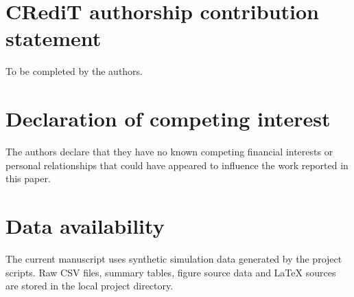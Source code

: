 \documentclass[preprint,12pt,number]{elsarticle}
\begin{document}
\section*{CRediT authorship contribution statement}
To be completed by the authors.

\section*{Declaration of competing interest}
The authors declare that they have no known competing financial interests or personal relationships that could have appeared to influence the work reported in this paper.

\section*{Data availability}
The current manuscript uses synthetic simulation data generated by the project scripts. Raw CSV files, summary tables, figure source data and LaTeX sources are stored in the local project directory.


\end{document}
